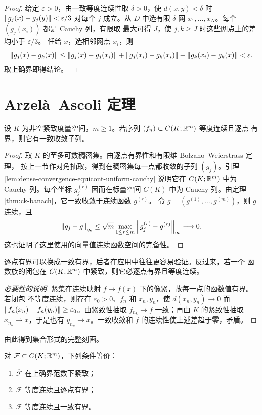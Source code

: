 \begin{proof}
给定 $\varepsilon>0$，由一致等度连续性取 $\delta>0$，使
$d(x,y)<\delta$ 时
$\left\lVert g_j(x)-g_j(y)\right\rVert<\varepsilon/3$ 对每个 $j$ 成立。从 $D$ 中选有限
$\delta$-网 $x_1,\ldots,x_N$。每个 $(g_j(x_i))$ 都是 Cauchy 列，有限取
最大可得 $J$，使 $j,k\ge J$ 时这些网点上的差均小于 $\varepsilon/3$。
任给 $x$，选相邻网点 $x_i$，则
\[
 \left\lVert g_j(x)-g_k(x)\right\rVert
 \le\left\lVert g_j(x)-g_j(x_i)\right\rVert+
    \left\lVert g_j(x_i)-g_k(x_i)\right\rVert+
    \left\lVert g_k(x_i)-g_k(x)\right\rVert<\varepsilon.
\]
取上确界即得结论。
\end{proof}

\section{Arzelà--Ascoli 定理}

\begin{theorem}
\label{thm:arzela-ascoli-sequential}
设 $K$ 为非空紧致度量空间，$m\ge1$。若序列 $(f_n)\subset C(K;\mathbb{R}^m)$ 等度连续且逐点
有界，则它有一致收敛子列。
\end{theorem}

\begin{proof}
取 $K$ 的至多可数稠密集。由逐点有界性和有限维 Bolzano--Weierstrass 定理，
按上一节作对角抽取，得到在稠密集每一点都收敛的子列 $(g_j)$。引理
\ref{lem:dense-convergence-equicont-uniform-cauchy} 说明它在 $C(K;\mathbb{R}^m)$
中为 Cauchy 列。每个坐标 $g_j^{(r)}$ 因而在标量空间 $C(K)$ 中为
Cauchy 列。由定理 \ref{thm:ck-banach}，它一致收敛于连续函数 $g^{(r)}$。
令 $g=(g^{(1)},\ldots,g^{(m)})$，则 $g$ 连续，且
\[
 \left\lVert g_j-g\right\rVert_\infty
 \le\sqrt m\max_{1\le r\le m}\left\lVert g_j^{(r)}-g^{(r)}\right\rVert_\infty
 \longrightarrow0.
\]
这也证明了这里使用的向量值连续函数空间的完备性。
\end{proof}

逐点有界可以换成一致有界，后者在应用中往往更容易验证。反过来，若一个
函数族的闭包在 $C(K;\mathbb{R}^m)$ 中紧致，则它必逐点有界且等度连续。

\begin{proof}[必要性的说明]
紧集在连续映射 $f\mapsto f(x)$ 下的像紧，故每一点的函数值有界。若闭包
不等度连续，则存在 $\varepsilon_0>0$、$f_n$ 和 $x_n,y_n$，使
$d(x_n,y_n)\to0$ 而
$\left\lVert f_n(x_n)-f_n(y_n)\right\rVert\ge\varepsilon_0$。由紧致性抽取
$f_{n_k}\to f$ 一致；再由 $K$ 的紧致性抽取 $x_{n_k}\to x$，于是也有
$y_{n_k}\to x$。一致收敛和 $f$ 的连续性使上述差趋于零，矛盾。
\end{proof}

由此得到集合形式的完整刻画。

\begin{theorem}[相对紧致性判据]
\label{thm:arzela-ascoli-relative-compactness}
对 $\mathcal F\subset C(K;\mathbb{R}^m)$，下列条件等价：
\begin{enumerate}
 \item $\overline{\mathcal F}$ 在上确界范数下紧致；
 \item $\mathcal F$ 等度连续且逐点有界；
 \item $\mathcal F$ 等度连续且一致有界。
\end{enumerate}
\end{theorem}

